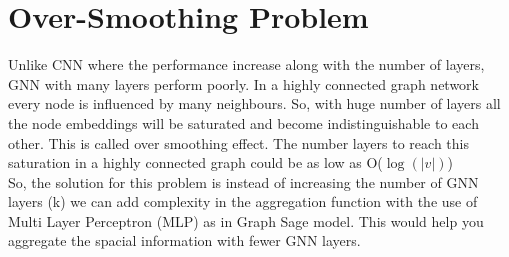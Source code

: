 \section{Over-Smoothing Problem}
Unlike CNN where the performance increase along with the number of layers, GNN with many layers perform poorly. In a highly connected graph network every node is influenced by many neighbours. So, with huge number of layers all the node embeddings will be saturated and become indistinguishable to each other. This is called over smoothing effect. The number layers to reach this saturation in a highly connected graph could be as low as O($\log(|v|)$)\\

So, the solution for this problem is instead of increasing the number of GNN layers (k) we can add complexity in the aggregation function with the use of Multi Layer Perceptron (MLP) as in Graph Sage model. This would help you aggregate the spacial information with fewer GNN layers. 